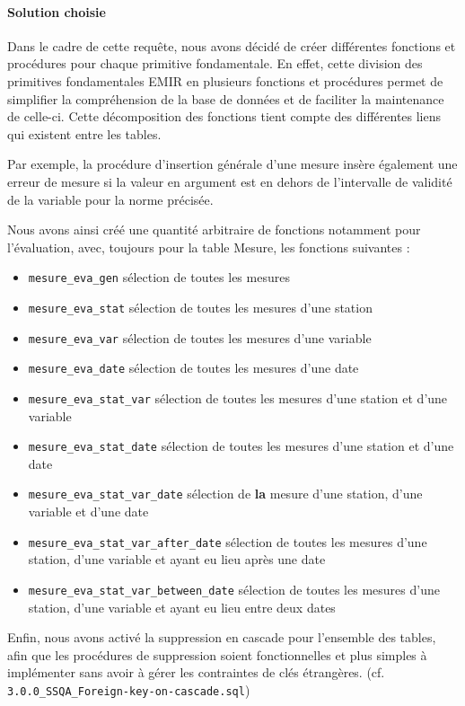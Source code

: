 \documentclass{article}
\begin{document}
\paragraph{Solution choisie}
Dans le cadre de cette requête, nous avons décidé de créer différentes fonctions et procédures pour chaque primitive fondamentale.
En effet, cette division des primitives fondamentales EMIR en plusieurs fonctions et procédures permet de simplifier la compréhension
 de la base de données et de faciliter la maintenance de celle-ci.
Cette décomposition des fonctions tient compte des différentes liens qui existent entre les tables. 

Par exemple,
la procédure d'insertion générale d'une mesure insère également une erreur de mesure si la 
valeur en argument est en dehors de l'intervalle de validité de la variable pour la norme précisée.

Nous avons ainsi créé une quantité arbitraire de fonctions notamment pour l'évaluation,
avec, toujours pour la table Mesure, les fonctions suivantes :
\begin{itemize}
    \item \texttt{mesure\_eva\_gen} sélection de toutes les mesures
    \item \texttt{mesure\_eva\_stat} sélection de toutes les mesures d'une station
    \item \texttt{mesure\_eva\_var} sélection de toutes les mesures d'une variable
    \item \texttt{mesure\_eva\_date} sélection de toutes les mesures d'une date
    \item \texttt{mesure\_eva\_stat\_var} sélection de toutes les mesures d'une station et d'une variable
    \item \texttt{mesure\_eva\_stat\_date} sélection de toutes les mesures d'une station et d'une date  
    \item \texttt{mesure\_eva\_stat\_var\_date} sélection de \textbf{la} mesure d'une station, d'une variable et d'une date
    \item \texttt{mesure\_eva\_stat\_var\_after\_date} sélection de toutes les mesures d'une station, d'une variable et ayant eu lieu après une date
    \item \texttt{mesure\_eva\_stat\_var\_between\_date} sélection de toutes les mesures d'une station, d'une variable et ayant eu lieu entre deux dates
\end{itemize}

Enfin, nous avons activé la suppression en cascade pour l'ensemble des tables, afin que les procédures
de suppression soient fonctionnelles et plus simples à implémenter sans avoir à gérer les contraintes
de clés étrangères. (cf. \texttt{3.0.0\_SSQA\_Foreign-key-on-cascade.sql})
\end{document}
